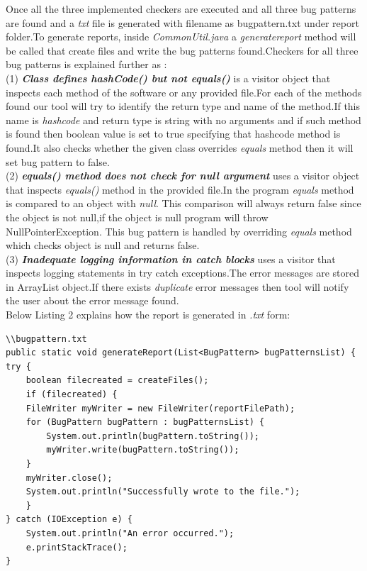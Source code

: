 \documentclass[sigplan,screen]{acmart}
\begin{document}
Once all the three implemented checkers are executed and all three bug patterns are found and a \emph{txt} file is generated with filename as bugpattern.txt  under report folder.To generate reports, inside \emph{CommonUtil.java} a \emph{generatereport} method will be called that create files and write the bug patterns found.Checkers for all three bug patterns is explained further as :\\
(1) \textbf{\emph{Class defines hashCode() but not equals()}} is a visitor object that inspects each method of the software or any provided file.For each of the methods found our tool will try to identify the return type and name of the method.If this name is \emph{hashcode} and return type is string with no arguments and if such method is found then boolean value is set to true specifying that hashcode method is found.It also checks whether the given class overrides \emph{equals} method then it will set bug pattern to false.\\
(2) \textbf{\emph{equals() method does not check for null argument}} uses a visitor object that inspects \emph{equals()} method in the provided file.In the program \emph{equals} method is compared to an object with \emph{null}. This comparison will always return false since the object is not null,if the object is null program will throw NullPointerException. This bug pattern is handled by overriding \emph{equals} method which checks object is null and returns false.\\
(3) \textbf{\emph{Inadequate logging information in catch blocks}} uses a visitor that inspects logging statements in try catch exceptions.The error messages are stored in ArrayList object.If there exists \emph{duplicate} error messages then tool will notify the user about the error message found.\\

Below Listing 2 explains how the report is generated in \emph{.txt} form:

\begin{lstlisting}[caption={Generate reports using bugpatterns},captionpos=b]
\\bugpattern.txt
public static void generateReport(List<BugPattern> bugPatternsList) {
try {
	boolean filecreated = createFiles();
	if (filecreated) {
	FileWriter myWriter = new FileWriter(reportFilePath);
	for (BugPattern bugPattern : bugPatternsList) {
		System.out.println(bugPattern.toString());
		myWriter.write(bugPattern.toString());
	}
	myWriter.close();
	System.out.println("Successfully wrote to the file.");
	}
} catch (IOException e) {
	System.out.println("An error occurred.");
	e.printStackTrace();
}
\end{lstlisting}
\end{document}
